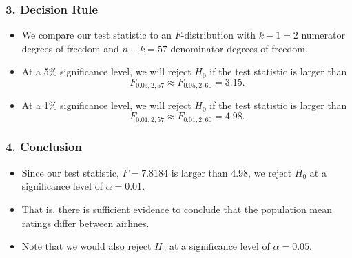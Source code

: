\documentclass[12pt]{beamer}
\begin{document}
\begin{frame}
	\frametitle{3. Decision Rule}
	
	\begin{itemize}[label={\color{blue}$\blacktriangleright$}]
		\item We compare our test statistic to an $F$-distribution with $k-1 = 2$ numerator degrees of freedom and $n-k = 57$ denominator degrees of freedom.
		
		\item At a 5\% significance level, we will reject $H_0$ if the test statistic is larger than
		\[ F_{0.05,2,57} \approx F_{0.05,2,60} = 3.15. \]
		
		\item At a 1\% significance level, we will reject $H_0$ if the test statistic is larger than
		\[ F_{0.01,2,57} \approx F_{0.01,2,60} = 4.98. \]
	\end{itemize}
	
\end{frame}
\begin{frame}
	\frametitle{4. Conclusion}
	
	\begin{itemize}[label={\color{blue}$\blacktriangleright$}]
		\item Since our test statistic, $F = 7.8184$ is larger than 4.98, we reject $H_0$ at a significance level of $\alpha = 0.01$.
		
		\item That is, there is sufficient evidence to conclude that the population mean ratings differ between airlines.
		
		\item Note that we would also reject $H_0$ at a significance level of $\alpha = 0.05$.
	\end{itemize}
	
\end{frame}
\end{document}
